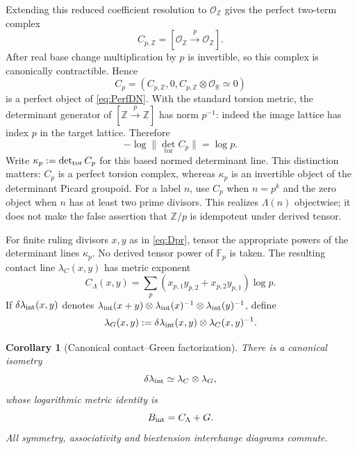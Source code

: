\documentclass[11pt]{amsart}
\newtheorem{corollary}[theorem]{Corollary}
\theoremstyle{definition}
\theoremstyle{remark}
\newcommand{\R}{\mathbb R}
\newcommand{\Z}{\mathbb Z}
\begin{document}
Extending this reduced coefficient resolution to $\mathcal O_{\Z}$ gives
the perfect two-term complex
\begin{equation}\label{eq:localcontact}
 C_{p,\Z}=[\mathcal O_{\Z}\xrightarrow{p}\mathcal O_{\Z}].
\end{equation}
After real base change multiplication by $p$ is invertible, so this complex
is canonically contractible.  Hence
\begin{equation}\label{eq:DNcontact}
 C_p=(C_{p,\Z},0,C_{p,\Z}\otimes\mathcal O_{\R}\simeq0)
\end{equation}
is a perfect object of \eqref{eq:PerfDN}.  With the standard torsion metric,
the determinant generator of $[\Z\xrightarrow p\Z]$ has norm $p^{-1}$:
indeed the image lattice has index $p$ in the target lattice.  Therefore
\begin{equation}\label{eq:contactmass}
 -\log\|\det_{\mathrm{tor}}C_p\|=\log p.
\end{equation}
Write $\kappa_p:=\det_{\rm tor}C_p$ for this based normed determinant
line.  This distinction matters: $C_p$ is a perfect torsion complex,
whereas $\kappa_p$ is an invertible object of the determinant Picard
groupoid.
For a label $n$, use $C_p$ when $n=p^k$ and the zero object when $n$ has at
least two prime divisors.  This realizes $\Lambda(n)$ objectwise; it does
not make the false assertion that $\Z/p$ is idempotent under derived tensor.

For finite ruling divisors $x,y$ as in \eqref{eq:Dpr}, tensor the appropriate
powers of the determinant lines $\kappa_p$.  No derived tensor power of
$\mathbb F_p$ is taken.  The resulting contact line
$\lambda_C(x,y)$ has metric exponent
\begin{equation}\label{eq:Clambda}
 C_\Lambda(x,y)=\sum_p
 (x_{p,1}y_{p,2}+x_{p,2}y_{p,1})\log p.
\end{equation}
If $\delta\lambda_{\rm int}(x,y)$ denotes
$\lambda_{\rm int}(x+y)\otimes
\lambda_{\rm int}(x)^{-1}\otimes
\lambda_{\rm int}(y)^{-1}$, define
\begin{equation}\label{eq:greenline}
 \lambda_G(x,y):=\delta\lambda_{\rm int}(x,y)
                  \otimes\lambda_C(x,y)^{-1}.
\end{equation}

\begin{corollary}[Canonical contact--Green factorization]
\label{cor:determinantcomparison}
There is a canonical isometry
\begin{equation}\label{eq:determinantComparison}
 \delta\lambda_{\rm int}
 \simeq\lambda_C\otimes\lambda_G,
\end{equation}
whose logarithmic metric identity is
\begin{equation}\label{eq:green}
 B_{\rm int}=C_\Lambda+G.
\end{equation}
All symmetry, associativity and biextension interchange diagrams commute.
\end{corollary}
\end{document}
